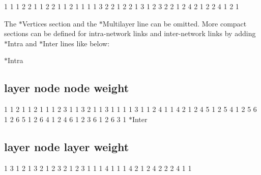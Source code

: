 1 1 1 2 2 1 1 2 2 1 1 2 1 1 1 1 3 2 2 1 2 2 1 3 1 2 3 2 2 1 2 4 2 1 2 2 4 1 2 1

The $\ast$\+Vertices section and the $\ast$\+Multilayer line can be omitted. More compact sections can be defined for intra-\/network links and inter-\/network links by adding $\ast$\+Intra and $\ast$\+Inter lines like below\+:

$\ast$\+Intra \subsection*{layer node node weight}

1 1 2 1 1 2 1 1 1 2 3 1 1 3 2 1 1 3 1 1 1 1 3 1 1 2 4 1 1 4 2 1 2 4 5 1 2 5 4 1 2 5 6 1 2 6 5 1 2 6 4 1 2 4 6 1 2 3 6 1 2 6 3 1 $\ast$\+Inter \subsection*{layer node layer weight}

1 3 1 2 1 3 2 1 2 3 2 1 2 3 1 1 1 4 1 1 1 4 2 1 2 4 2 2 2 4 1 1

